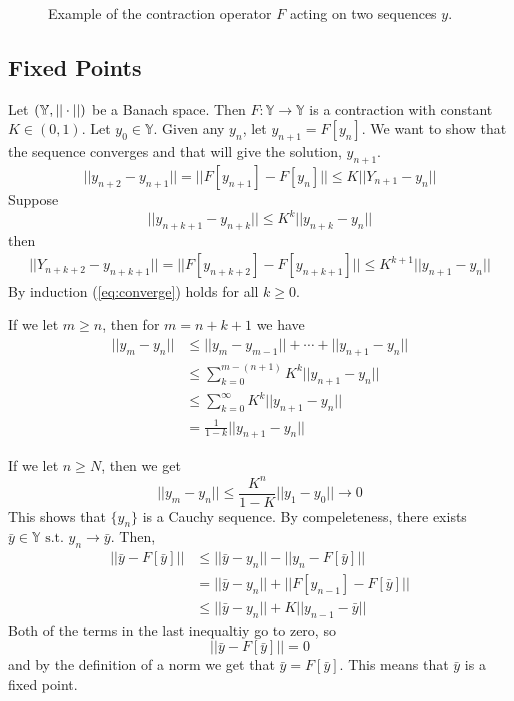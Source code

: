 \begin{figure}[ht!]
\centering
{} \hfill
{}
\caption{Example of the contraction operator $F$ acting on two sequences $y$.}
\label{fig:07contraction}
\end{figure}

\subsection{Fixed Points}
Let $(\mathbb{Y},||\cdot||)$ be a Banach space.
Then $F:\mathbb{Y}\to\mathbb{Y}$ is a contraction with constant $K\in(0,1)$.
Let $y_0\in\mathbb{Y}$.
Given any $y_n$, let $y_{n+1}=F[y_n]$.
We want to show that the sequence converges and that will give the solution, $y_{n+1}$.
$$||y_{n+2}-y_{n+1}|| = ||F[y_{n+1}]-F[y_n]|| \leq K||Y_{n+1}-y_n||$$
Suppose
$$||y_{n+k+1}-y_{n+k}||\leq K^k||y_{n+k}-y_n||$$
then
\begin{align}
\label{eq:converge}
||Y_{n+k+2}-y_{n+k+1}|| = ||F[y_{n+k+2}]-F[y_{n+k+1}]|| \leq K^{k+1}||y_{n+1}-y_n||
\end{align}
By induction (\ref{eq:converge}) holds for all $k\geq0$.

If we let $m\geq n$, then for $m=n+k+1$ we have
\begin{align*}
||y_m-y_n|| &\leq ||y_m-y_{m-1}|| + \cdots + ||y_{n+1}-y_n|| \\
&\leq \sum_{k=0}^{m-(n+1)} K^k||y_{n+1}-y_n|| \\
&\leq \sum_{k=0}^\infty K^k||y_{n+1}-y_n|| \\
&= \frac{1}{1-k}||y_{n+1}-y_n||
\end{align*}

If we let $n\geq N$, then we get
$$||y_m-y_n|| \leq \frac{K^n}{1-K}||y_1-y_0||\to0$$
This shows that $\{y_n\}$ is a Cauchy sequence.
By compeleteness, there exists $\bar{y}\in\mathbb{Y}\text{~s.t.~} y_n\to\bar{y}$.
Then,
\begin{align*}
||\bar{y}-F[\bar{y}]|| &\leq ||\bar{y}-y_n|| - ||y_n-F[\bar{y}]|| \\
&= ||\bar{y}-y_n|| + ||F[y_{n-1}]-F[\bar{y}]|| \\
&\leq ||\bar{y}-y_n|| + K||y_{n-1}-\bar{y}||
\end{align*}
Both of the terms in the last inequaltiy go to zero, so
$$||\bar{y}-F[\bar{y}]|| = 0$$
and by the definition of a norm we get that $\bar{y}=F[\bar{y}]$.
This means that $\bar{y}$ is a fixed point.


